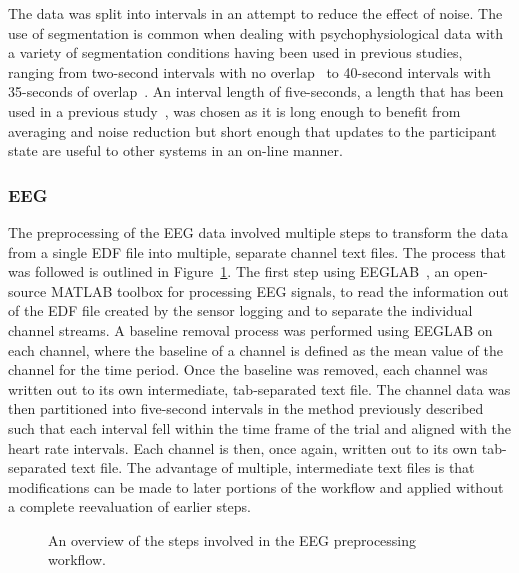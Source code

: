 \documentclass[11pt]{article}
\begin{document}
	The data was split into intervals in an attempt to reduce the effect of noise. The use of segmentation is common when dealing with psychophysiological data with a variety of segmentation conditions having been used in previous studies, ranging from two-second intervals with no overlap~\cite{Smith} to 40-second intervals with 35-seconds of overlap~\cite{Wang_Z}. An interval length of five-seconds, a length that has been used in a previous study~\cite{Yin}, was chosen as it is long enough to benefit from averaging and noise reduction but short enough that updates to the participant state are useful to other systems in an on-line manner. 
	
		\subsubsection{EEG}
		The preprocessing of the EEG data involved multiple steps to transform the data from a single EDF file into multiple, separate channel text files. The process that was followed is outlined in Figure~\ref{fig:eeg-preprocessing}. The first step using EEGLAB~\cite{EEGLAB}, an open-source MATLAB toolbox for processing EEG signals, to read the information out of the EDF file created by the sensor logging and to separate the individual channel streams. A baseline removal process was performed using EEGLAB on each channel, where the baseline of a channel is defined as the mean value of the channel for the time period. Once the baseline was removed, each channel was written out to its own intermediate, tab-separated text file. The channel data was then partitioned into five-second intervals in the method previously described such that each interval fell within the time frame of the trial and aligned with the heart rate intervals. Each channel is then, once again, written out to its own tab-separated text file. The advantage of multiple, intermediate text files is that modifications can be made to later portions of the workflow and applied without a complete reevaluation of earlier steps.

		\begin{figure}
		\centering
		\caption[Overview of EEG Preprocessing Workflow]{An overview of the steps involved in the EEG preprocessing workflow.}
		\label{fig:eeg-preprocessing}
		\end{figure} 
			
\end{document}
